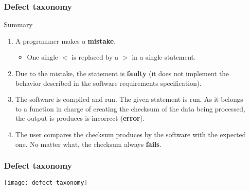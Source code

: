 \begin{frame}
\frametitle{Defect taxonomy}

\begin{block:procedure}{Summary}
\begin{enumerate}
	\item A programmer makes a \textbf{mistake}.
	\begin{itemize}
		\item One single $<$ is replaced by a $>$ in a single statement.
	\end{itemize}

	\item Due to the mistake, the statement is \textbf{faulty} (it does
	not implement the behavior described in the software requirements
	specification).

	\item The software is compiled and run. The given statement is run. As it
	belongs to a function in charge of creating the checksum of the data being
	processed, the output is produces is incorrect (\textbf{error}).

	\item The user compares the checksum produces by the software with the
	expected one. No matter what, the checksum always \textbf{fails}.
\end{enumerate}
\end{block:procedure}
\end{frame}



\begin{frame}[c, hasprev=true, hasnext=false]
\label{concept:defect-taxonomy}
\frametitle{Defect taxonomy}

\begin{block:fact}{}
    \centering
    \texttt{[image: defect-taxonomy]}
\end{block:fact}

\hfill
{}
\end{frame}
